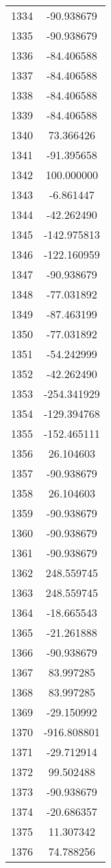 \documentclass[12pt]{article}
\begin{document}
\begin{longtable}{@{}cc@{}}
1334 & -90.938679 \\
1335 & -90.938679 \\
1336 & -84.406588 \\
1337 & -84.406588 \\
1338 & -84.406588 \\
1339 & -84.406588 \\
1340 & 73.366426 \\
1341 & -91.395658 \\
1342 & 100.000000 \\
1343 & -6.861447 \\
1344 & -42.262490 \\
1345 & -142.975813 \\
1346 & -122.160959 \\
1347 & -90.938679 \\
1348 & -77.031892 \\
1349 & -87.463199 \\
1350 & -77.031892 \\
1351 & -54.242999 \\
1352 & -42.262490 \\
1353 & -254.341929 \\
1354 & -129.394768 \\
1355 & -152.465111 \\
1356 & 26.104603 \\
1357 & -90.938679 \\
1358 & 26.104603 \\
1359 & -90.938679 \\
1360 & -90.938679 \\
1361 & -90.938679 \\
1362 & 248.559745 \\
1363 & 248.559745 \\
1364 & -18.665543 \\
1365 & -21.261888 \\
1366 & -90.938679 \\
1367 & 83.997285 \\
1368 & 83.997285 \\
1369 & -29.150992 \\
1370 & -916.808801 \\
1371 & -29.712914 \\
1372 & 99.502488 \\
1373 & -90.938679 \\
1374 & -20.686357 \\
1375 & 11.307342 \\
1376 & 74.788256 \\

\end{longtable}
\end{document}
